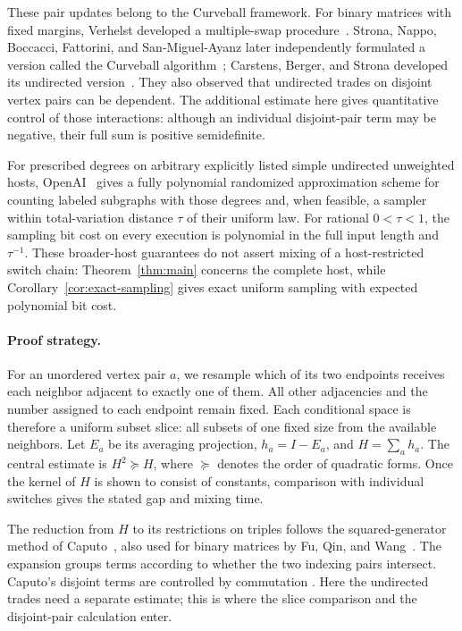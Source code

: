 These pair updates belong to the Curveball framework. For binary
matrices with fixed margins, Verhelst developed a multiple-swap
procedure~\cite{Verhelst08}. Strona, Nappo, Boccacci, Fattorini, and
San-Miguel-Ayanz later independently formulated a version called the
Curveball algorithm~\cite{Strona14,Strona16,CK18}; Carstens, Berger,
and Strona developed its undirected version~\cite{CBS18}.
They also observed that undirected trades on disjoint vertex pairs can
be dependent. The additional estimate here gives quantitative control
of those interactions: although an individual disjoint-pair term may
be negative, their full sum is positive semidefinite.

For prescribed degrees on arbitrary explicitly listed simple undirected
unweighted hosts, OpenAI~\cite[Corollary~10.1]{OpenAIPerfectMatchings2026}
gives a fully polynomial randomized approximation scheme for counting
labeled subgraphs with those degrees and, when feasible, a sampler within
total-variation distance $\tau$ of their uniform law. For rational
$0<\tau<1$, the sampling bit cost on every execution is polynomial in the
full input length and $\tau^{-1}$. These broader-host guarantees do not
assert mixing of a host-restricted switch chain: Theorem~\ref{thm:main}
concerns the complete host, while Corollary~\ref{cor:exact-sampling}
gives exact uniform sampling with expected polynomial bit cost.

\paragraph{Proof strategy.}
For an unordered vertex pair $a$, we resample which of its two endpoints
receives each neighbor adjacent to exactly one of them. All other
adjacencies and the number assigned to each endpoint remain fixed.
Each conditional space is therefore a uniform subset slice: all subsets
of one fixed size from the available neighbors. Let $E_a$ be its
averaging projection, $h_a=I-E_a$, and $H=\sum_a h_a$.
The central estimate is $H^2\succeq H$, where $\succeq$ denotes the
order of quadratic forms. Once the kernel of $H$ is shown to consist
of constants, comparison with individual switches gives the stated
gap and mixing time.

The reduction from $H$ to its restrictions on triples follows the
squared-generator method of Caputo~\cite[Section~1.1]{Caputo08}, also
used for binary matrices by Fu, Qin, and Wang~\cite[Lemma~4.1]{FQW26}.
The expansion groups terms according to whether the two indexing pairs
intersect. Caputo's disjoint terms are controlled by commutation
\cite[Equation~(1.11)]{Caputo08}.
Here the undirected trades need a separate estimate; this is where
the slice comparison and the disjoint-pair calculation enter.

